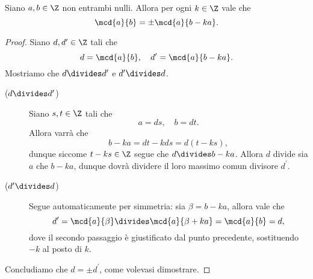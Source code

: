 \begin{lemma}\label{lem:mcd_diff}
    Siano $a, b \in \Z$ non entrambi nulli. Allora per ogni $k \in \Z$ vale che \begin{equation}
        \mcd{a}{b} = \pm\mcd{a}{b-ka}.    
    \end{equation}
\end{lemma}
\begin{proof}
    Siano $d, d^\prime \in \Z$ tali che \[
        d = \mcd{a}{b}, \quad d^\prime = \mcd{a}{b-ka}.    
    \] Mostriamo che $d \divides d^\prime$ e $d^\prime \divides d$.

    \begin{description}
        \item[($d \divides d^\prime$)] Siano $s, t \in \Z$ tali che \[
            a = ds, \quad b = dt.    
        \] Allora varrà che \[
            b - ka = dt - kds = d(t - ks),    
        \] dunque siccome $t - ks \in \Z$ segue che $d \divides b - ka$.
        Allora $d$ divide sia $a$ che $b - ka$, dunque dovrà dividere il loro massimo comun divisore $d^\prime$.
        \item[($d^\prime \divides d$)] Segue automaticamente per simmetria: sia $\beta = b - ka$, allora vale che \[
            d^\prime = \mcd{a}{\beta} \divides \mcd{a}{\beta + ka} = \mcd{a}{b} = d,  
        \] dove il secondo passaggio è giustificato dal punto precedente, sostituendo $-k$ al posto di $k$.
    \end{description}
    Concludiamo che $d = \pm d^\prime$, come volevasi dimostrare.
\end{proof}

